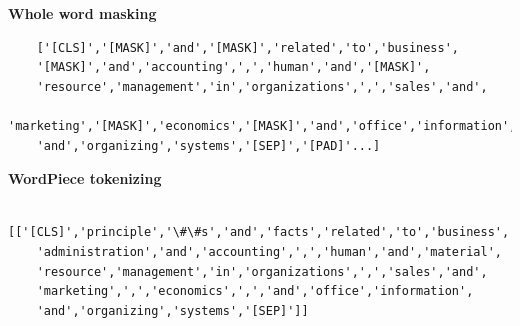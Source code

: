 \documentclass[12pt]{article}
\begin{document}
\textbf{Whole word masking}

\begin{verbatim}
    ['[CLS]','[MASK]','and','[MASK]','related','to','business',
    '[MASK]','and','accounting',',','human','and','[MASK]',
    'resource','management','in','organizations',',','sales','and',
    'marketing','[MASK]','economics','[MASK]','and','office','information',
    'and','organizing','systems','[SEP]','[PAD]'...]
\end{verbatim}


\textbf{WordPiece tokenizing}

\begin{verbatim}
    [['[CLS]','principle','\#\#s','and','facts','related','to','business',
    'administration','and','accounting',',','human','and','material',
    'resource','management','in','organizations',',','sales','and',
    'marketing',',','economics',',','and','office','information',
    'and','organizing','systems','[SEP]']]
\end{verbatim}





\clearpage



\end{document}

